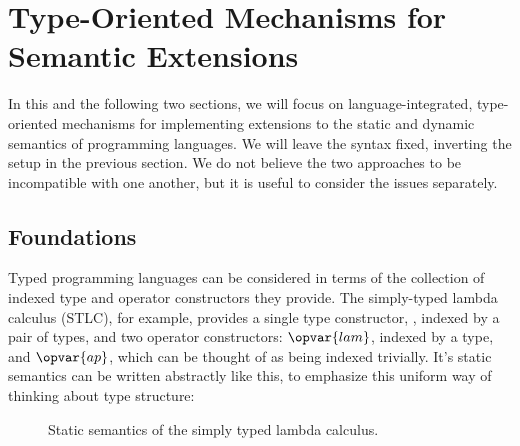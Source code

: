 


\section{Type-Oriented Mechanisms for Semantic Extensions}\label{att}

In this and the following two sections, we will focus on language-integrated, type-oriented mechanisms for implementing extensions to the static and dynamic semantics of programming languages. We will leave the syntax fixed, inverting the setup in the previous section. We do not believe  the two approaches to be incompatible with one another, but it is useful to consider the issues separately.

\subsection{Foundations}
Typed programming languages can be considered in terms of the collection of indexed type and operator constructors they provide. The simply-typed lambda calculus (STLC), for example, provides a single type constructor, , indexed by a pair of types, and two operator constructors: $\opvar{lam}$, indexed by a type, and $\opvar{ap}$, which can be thought of as being indexed trivially. It's static semantics can be written abstractly like this, to emphasize this uniform way of thinking about type structure:
\begin{figure}[h]
\small
\vspace{-8pt}
\begin{mathpar}


\end{mathpar}
\vspace{-8pt}
\caption{Static semantics of the simply typed lambda calculus.}
\end{figure}

